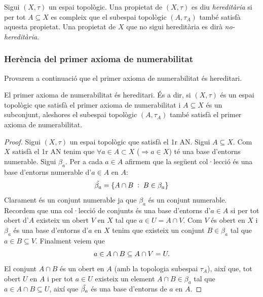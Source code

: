 \documentclass[../main.tex]{subfiles}
\begin{document}
\begin{defi}
\label{def:hereditaria} Sigui $(X,\tau)$ un espai topològic. Una propietat de $(X,\tau)$ es diu \textit{hereditària} si per tot $A\subseteq X$ es compleix que el subespai topològic $(A,\tau_A)$ també satisfà aquesta propietat. Una propietat de $X$ que no sigui hereditària es dirà \textit{no-hereditària}.
\end{defi}

\subsubsection{Herència del primer axioma de numerabilitat}
Provarem a continuació que el primer axioma de numerabilitat és hereditari.

\begin{ter}
\label{ter:1anhereditari} El primer axioma de numerabilitat és hereditari. És a dir, si $(X,\tau)$ és un espai topològic que satisfà el primer axioma de numerabilitat i $A\subseteq X$ és un subconjunt, aleshores el subespai topològic $(A,\tau_A)$ també satisfà el primer axioma de numerabilitat.
\end{ter}
\begin{proof}
Sigui $(X,\tau)$ un espai topològic que satisfà el 1r AN. Sigui $A\subseteq X$. Com $X$ satisfà el 1r AN tenim que $\forall a\in A\subset X$ ($\Rightarrow a\in X$) té una base d'entorns numerable. Sigui $\beta_a$. Per a cada $a\in A$ afirmem que la següent col·lecció és una base d'entorns numerable d'$a\in A$ en $A$:
\begin{equation}
    \notag
    \Tilde{\beta_a} = \{A\cap B\;:\;B\in\beta_a\}
\end{equation}
Clarament és un conjunt numerable ja que $\beta_a$ és un conjunt numerable. Recordem que una col·lecció de conjunts és una base d'entorns d'$a\in A$ si per tot obert d'$A$ existeix un obert $V$ en $X$ tal que $a\in U = A\cap V$. Com $V$ és obert en $X$ i $\beta_a$ és una base d'entorns d'$a$ en $X$ tenim que existeix un conjunt $B\in\beta_a$ tal que $a\in B\subseteq V$. Finalment veiem que 
\begin{equation}
    \notag
    a\in A\cap B\subseteq A\cap V = U.
\end{equation}
El conjunt $A\cap B$ és un obert en $A$ (amb la topologia subespai $\tau_A$), així que, tot obert $U$ en $A$ i per tot $a\in U$ existeix un element $A\cap B\in \beta_a$ tal que $a\in A\cap B\subseteq U$, així que $\Tilde{\beta_a}$ és una base d'entorns de $a$ en $A$.
\end{proof}
\end{document}
